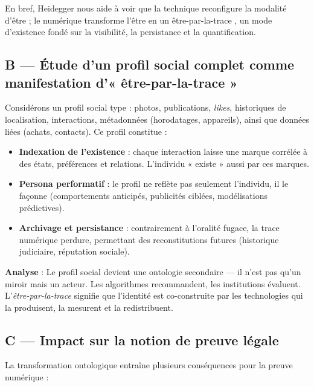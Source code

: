 \documentclass[memoire, 12pt]{report}
\begin{document}
\begin{titlepage}
En bref, Heidegger nous aide à voir que la technique reconfigure la modalité d’être ; le numérique transforme l’être en un \og être-par-la-trace \fg{}, un mode d’existence fondé sur la visibilité, la persistance et la quantification.

\subsection*{B — Étude d’un profil social complet comme manifestation d’« être-par-la-trace »}

Considérons un profil social type : photos, publications, \textit{likes}, historiques de localisation, interactions, métadonnées (horodatages, appareils), ainsi que données liées (achats, contacts). Ce profil constitue :

\begin{itemize}
    \item \textbf{Indexation de l’existence} : chaque interaction laisse une marque corrélée à des états, préférences et relations. L’individu « existe » aussi par ces marques.
    \item \textbf{Persona performatif} : le profil ne reflète pas seulement l’individu, il le façonne (comportements anticipés, publicités ciblées, modélisations prédictives).
    \item \textbf{Archivage et persistance} : contrairement à l’oralité fugace, la trace numérique perdure, permettant des reconstitutions futures (historique judiciaire, réputation sociale).
\end{itemize}

\textbf{Analyse} : Le profil social devient une \og ontologie secondaire \fg{} — il n’est pas qu’un miroir mais un acteur. Les algorithmes recommandent, les institutions évaluent. L’\textit{être-par-la-trace} signifie que l’identité est co-construite par les technologies qui la produisent, la mesurent et la redistribuent.

\subsection*{C — Impact sur la notion de preuve légale}

La transformation ontologique entraîne plusieurs conséquences pour la preuve numérique :


\end{titlepage}
\end{document}
